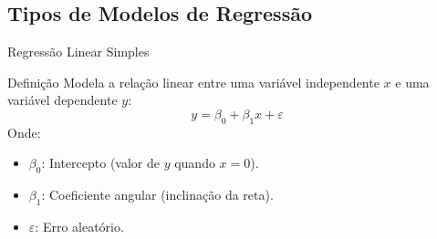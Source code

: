 \documentclass[]{beamer}
\begin{document}
\subsection{Tipos de Modelos de Regressão}

\begin{frame}{Regressão Linear Simples}
\footnotesize
  \begin{block}{Definição}
    Modela a relação linear entre uma variável independente \( x \) e uma variável dependente \( y \):
    \[
    y = \beta_0 + \beta_1 x + \varepsilon
    \]
    Onde:
    \begin{itemize}
      \item \( \beta_0 \): Intercepto (valor de \( y \) quando \( x = 0 \)).
      \item \( \beta_1 \): Coeficiente angular (inclinação da reta).
      \item \( \varepsilon \): Erro aleatório.
    \end{itemize}
  \end{block}
    \centering
\vspace*{-0.1cm}
\end{frame}
\end{document}

